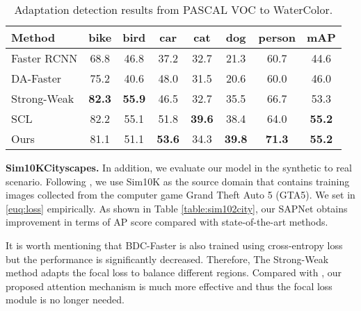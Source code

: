 \documentclass[runningheads]{llncs}
\begin{document}
\begin{table*}[t]
\centering
\caption{Adaptation detection results from PASCAL VOC to WaterColor.}
\setlength{\tabcolsep}{7.5pt}
\begin{tabular}{l|cccccc|c}
\hline
Method & bike &bird &car &cat &dog &person& mAP\\
\hline
Faster RCNN              & 68.8& 46.8& 37.2& 32.7& 21.3& 60.7& 44.6 \\
DA-Faster \cite{DBLP:conf/cvpr/Chen0SDG18} & 75.2& 40.6& 48.0& 31.5& 20.6& 60.0& 46.0 \\
Strong-Weak \cite{DBLP:conf/cvpr/SaitoUHS19} & \bf82.3& \bf55.9& 46.5& 32.7& 35.5& 66.7& 53.3 \\
SCL \cite{DBLP:journals/corr/abs-1911-02559}                 & 82.2& 55.1& 51.8& \bf39.6&38.4 & 64.0& \bf55.2 \\
Ours                          &81.1   &51.1 &\bf53.6 &34.3 &\bf39.8 &\bf71.3 & \bf55.2 \\
\hline
\end{tabular}
\label{table:voc2watercolor}
\end{table*}

\noindent \textbf{Sim10KCityscapes.} In addition, we evaluate our model in the synthetic to real scenario. Following \cite{DBLP:conf/cvpr/Chen0SDG18,DBLP:conf/cvpr/SaitoUHS19}, we use Sim10K \cite{DBLP:conf/icra/Johnson-Roberson17} as the source domain that contains  training images collected from the computer game Grand Theft Auto 5 (GTA5). We set  in \eqref{euq:loss} empirically. As shown in Table \ref{table:sim102city}, our SAPNet obtains  improvement in terms of AP score compared with state-of-the-art methods.

It is worth mentioning that BDC-Faster \cite{DBLP:conf/cvpr/SaitoUHS19} is also trained using cross-entropy loss but the performance is significantly decreased. Therefore, The Strong-Weak method \cite{DBLP:conf/cvpr/SaitoUHS19} adapts the focal loss \cite{DBLP:conf/iccv/LinGGHD17} to balance different regions. Compared with \cite{DBLP:conf/cvpr/SaitoUHS19,DBLP:journals/corr/abs-1911-02559}, our proposed attention mechanism is much more effective and thus the focal loss module is no longer needed.
\end{document}
